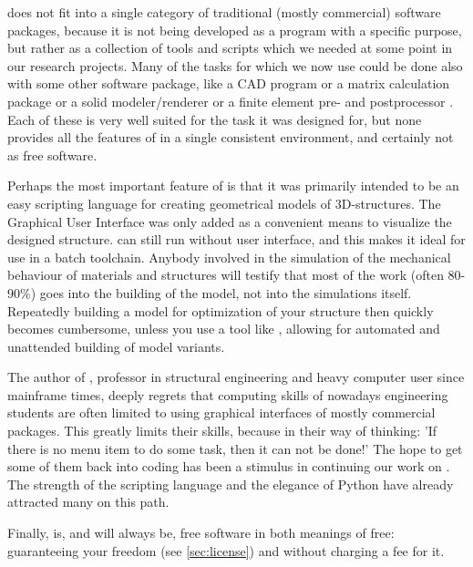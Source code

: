 \pyformex does not fit into a single category of traditional (mostly commercial) software packages, because it is not being developed as a program with a specific purpose, but rather as a collection of tools and scripts which we needed at some point in our research projects. Many of the tasks for which we now use \pyformex could be done also with some other software package, like a CAD program %
or a %
matrix calculation package or a solid modeler/renderer %
or a finite element pre- and postprocessor%
. Each of these is very well suited for the task it was designed for, but none provides all the features of \pyformex in a single consistent environment, and certainly not as free software. 


Perhaps the most important feature of \pyformex is that it was primarily intended to be an easy scripting language for creating geometrical models of 3D-structures. The Graphical User Interface was only added as a convenient means to visualize the designed structure. \pyformex can still run without user interface, and this makes it ideal for use in a batch toolchain. Anybody involved in the simulation of the mechanical behaviour of materials and structures will testify that most of the work (often 80-90\%) goes into the building of the model, not into the simulations itself. Repeatedly building a model for optimization of your structure then quickly becomes cumbersome, unless you use a tool like \pyf, allowing for automated and unattended building of model variants. 


The author of \pyformex, professor in structural engineering and heavy computer user since mainframe times, deeply regrets that computing skills of nowadays engineering students are often limited to using graphical interfaces of mostly commercial packages. This greatly limits their skills, because in their way of thinking: 'If there is no menu item to do some task, then it can not be done!'
The hope to get some of them back into coding has been a stimulus in continuing our work on \pyformex. The strength of the \pyformex scripting language and the elegance of Python have already attracted many on this path.
 
Finally, \pyformex is, and will always be, free software in both meanings of free: guaranteeing your freedom (see \ref{sec:license}) and without charging a fee for it. 


